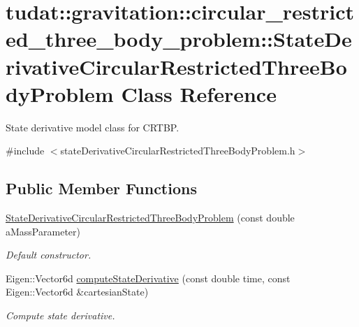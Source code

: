 \hypertarget{classtudat_1_1gravitation_1_1circular__restricted__three__body__problem_1_1StateDerivativeCircularRestrictedThreeBodyProblem}{}\section{tudat\+:\+:gravitation\+:\+:circular\+\_\+restricted\+\_\+three\+\_\+body\+\_\+problem\+:\+:State\+Derivative\+Circular\+Restricted\+Three\+Body\+Problem Class Reference}
\label{classtudat_1_1gravitation_1_1circular__restricted__three__body__problem_1_1StateDerivativeCircularRestrictedThreeBodyProblem}


State derivative model class for C\+R\+T\+BP.  




{\ttfamily \#include $<$state\+Derivative\+Circular\+Restricted\+Three\+Body\+Problem.\+h$>$}

\subsection*{Public Member Functions}
\begin{DoxyCompactItemize}
\item 
\hyperlink{classtudat_1_1gravitation_1_1circular__restricted__three__body__problem_1_1StateDerivativeCircularRestrictedThreeBodyProblem_a5d62242e74bcb7bc1a7e86dfaee4087a}{State\+Derivative\+Circular\+Restricted\+Three\+Body\+Problem} (const double a\+Mass\+Parameter)
\begin{DoxyCompactList}\small\item\em Default constructor. \end{DoxyCompactList}\item 
Eigen\+::\+Vector6d \hyperlink{classtudat_1_1gravitation_1_1circular__restricted__three__body__problem_1_1StateDerivativeCircularRestrictedThreeBodyProblem_afd1ba4dddda0d973b562ba3e36ce8517}{compute\+State\+Derivative} (const double time, const Eigen\+::\+Vector6d \&cartesian\+State)
\begin{DoxyCompactList}\small\item\em Compute state derivative. \end{DoxyCompactList}\end{DoxyCompactItemize}


